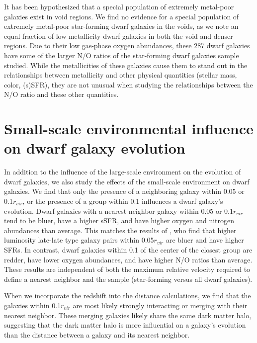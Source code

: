 It has been hypothesized that a special population of extremely metal-poor 
galaxies exist in void regions.  We find no evidence for a special population of 
extremely metal-poor star-forming dwarf galaxies in the voids, as we note an 
equal fraction of low metallicity dwarf galaxies in both the void and denser 
regions.  Due to their low gas-phase oxygen abundances, these 287 dwarf galaxies 
have some of the larger N/O ratios of the star-forming dwarf galaxies sample 
studied.  While the metallicities of these galaxies cause them to stand out in 
the relationships between metallicity and other physical quantities (stellar 
mass, color, (s)SFR), they are not unusual when studying the relationships 
between the N/O ratio and these other quantities.

\section[Small-scale environment]{Small-scale environmental influence on dwarf galaxy evolution}
In addition to the influence of the large-scale environment on the evolution of 
dwarf galaxies, we also study the effects of the small-scale environment on dwarf 
galaxies.  We find that only the presence of a neighboring galaxy within 0.05 
\hMpc or 0.1$r_{vir}$, or the presence of a group within 0.1 \hMpc influences a 
dwarf galaxy's evolution.  Dwarf galaxies with a nearest neighbor galaxy within 
0.05 \hMpc or 0.1$r_{vir}$ tend to be bluer, have a higher sSFR, and have higher 
oxygen and nitrogen abundances than average.  This matches the results of 
\cite{Park09}, who find that higher luminosity late-late type galaxy pairs 
within 0.05$r_{vir}$ are bluer and have higher SFRs.  In contrast, dwarf 
galaxies within 0.1 \hMpc of the center of the closest group are redder, have 
lower oxygen abundances, and have higher N/O ratios than average.  These results 
are independent of both the maximum relative velocity required to define a 
nearest neighbor and the sample (star-forming versus all dwarf galaxies).

When we incorporate the redshift into the distance calculations, we find that 
the galaxies within 0.1$r_{vir}$ are most likely strongly interacting or merging 
with their nearest neighbor.  These merging galaxies likely share the same dark 
matter halo, suggesting that the dark matter halo is more influential on a 
galaxy's evolution than the distance between a galaxy and its nearest neighbor.

